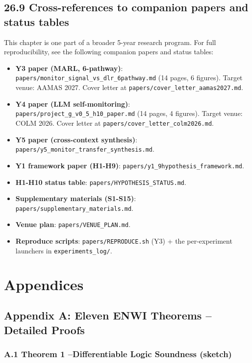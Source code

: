 \documentclass[11pt]{article}
\begin{document}
\hrulefill

\subsection{26.9 Cross-references to companion papers and status tables}

This chapter is one part of a broader 5-year research program. For full reproducibility, see the following companion papers and status tables:

\begin{itemize}
  \item \textbf{Y3 paper (MARL, 6-pathway)}: \texttt{papers/monitor\_signal\_vs\_dlr\_6pathway.md} (14 pages, 6 figures). Target venue: AAMAS 2027. Cover letter at \texttt{papers/cover\_letter\_aamas2027.md}.
  \item \textbf{Y4 paper (LLM self-monitoring)}: \texttt{papers/project\_g\_v0\_5\_h10\_paper.md} (14 pages, 4 figures). Target venue: COLM 2026. Cover letter at \texttt{papers/cover\_letter\_colm2026.md}.
  \item \textbf{Y5 paper (cross-context synthesis)}: \texttt{papers/y5\_monitor\_transfer\_synthesis.md}.
  \item \textbf{Y1 framework paper (H1-H9)}: \texttt{papers/y1\_9hypothesis\_framework.md}.
  \item \textbf{H1-H10 status table}: \texttt{papers/HYPOTHESIS\_STATUS.md}.
  \item \textbf{Supplementary materials (S1-S15)}: \texttt{papers/supplementary\_materials.md}.
  \item \textbf{Venue plan}: \texttt{papers/VENUE\_PLAN.md}.
  \item \textbf{Reproduce scripts}: \texttt{papers/REPRODUCE.sh} (Y3) + the per-experiment launchers in \texttt{experiments\_log/}.
\end{itemize}

\hrulefill

\section*{Appendices}

\subsection{Appendix A: Eleven ENWI Theorems --Detailed Proofs}

\subsubsection{A.1 Theorem 1 --Differentiable Logic Soundness (sketch)}
\end{document}
